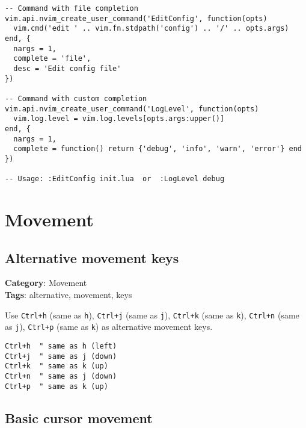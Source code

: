 {{{{{{{\begin{Exa*}{}
\begin{Verbatim}[fontsize=\footnotesize, breaklines, breakanywhere]
-- Command with file completion
vim.api.nvim_create_user_command('EditConfig', function(opts)
  vim.cmd('edit ' .. vim.fn.stdpath('config') .. '/' .. opts.args)
end, {
  nargs = 1,
  complete = 'file',
  desc = 'Edit config file'
})

-- Command with custom completion
vim.api.nvim_create_user_command('LogLevel', function(opts)
  vim.log.level = vim.log.levels[opts.args:upper()]
end, {
  nargs = 1,
  complete = function() return {'debug', 'info', 'warn', 'error'} end
})

-- Usage: :EditConfig init.lua  or  :LogLevel debug
\end{Verbatim}
\end{Exa*}

\chapter{Movement}
\section{Alternative movement keys}

\textbf{Category}: Movement\\ \textbf{Tags}: alternative, movement, keys
\vspace{0.5cm}

Use {\footnotesize \Verb§Ctrl+h§} (same as {\footnotesize \Verb§h§}), {\footnotesize \Verb§Ctrl+j§} (same as {\footnotesize \Verb§j§}), {\footnotesize \Verb§Ctrl+k§} (same as {\footnotesize \Verb§k§}), {\footnotesize \Verb§Ctrl+n§} (same as {\footnotesize \Verb§j§}), {\footnotesize \Verb§Ctrl+p§} (same as {\footnotesize \Verb§k§}) as alternative movement keys.

\begin{Exa*}{}
\begin{Verbatim}[fontsize=\footnotesize, breaklines, breakanywhere]
Ctrl+h  " same as h (left)
Ctrl+j  " same as j (down)  
Ctrl+k  " same as k (up)
Ctrl+n  " same as j (down)
Ctrl+p  " same as k (up)
\end{Verbatim}
\end{Exa*}

\section{Basic cursor movement}

}}}}}}}
